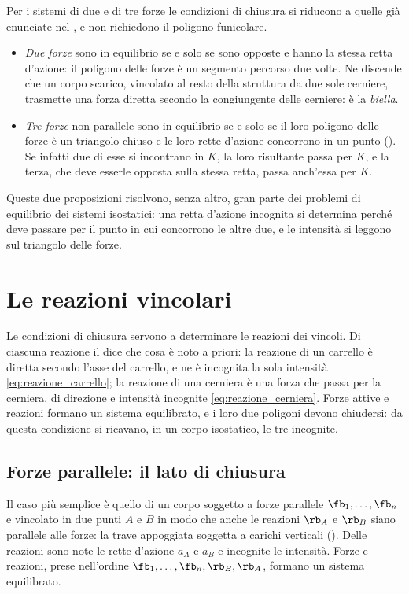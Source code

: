 Per i sistemi di due e di tre forze le condizioni di chiusura si riducono a quelle già enunciate
nel , e non richiedono il poligono funicolare.
\begin{itemize}
	\item \emph{Due forze} sono in equilibrio se e solo se sono opposte e hanno la stessa retta
	d'azione: il poligono delle forze è un segmento percorso due volte. Ne discende che un corpo
	scarico, vincolato al resto della struttura da due sole cerniere, trasmette una forza diretta
	secondo la congiungente delle cerniere: è la \emph{biella}.
	\item \emph{Tre forze} non parallele sono in equilibrio se e solo se il loro poligono delle forze
	è un triangolo chiuso e le loro rette d'azione concorrono in un punto
	(). Se infatti due di esse si incontrano in $K$, la loro risultante
	passa per $K$, e la terza, che deve esserle opposta sulla stessa retta, passa anch'essa per
	$K$.
\end{itemize}
Queste due proposizioni risolvono, senza altro, gran parte dei problemi di equilibrio dei sistemi
isostatici: una retta d'azione incognita si determina perché deve passare per il punto in cui
concorrono le altre due, e le intensità si leggono sul triangolo delle forze.

\section{Le reazioni vincolari}
\label{sec:reazioni_sgr}

Le condizioni di chiusura servono a determinare le reazioni dei vincoli. Di ciascuna reazione il
 dice che cosa è noto a priori: la reazione di un carrello è diretta
secondo l'asse del carrello, e ne è incognita la sola intensità \eqref{eq:reazione_carrello}; la
reazione di una cerniera è una forza che passa per la cerniera, di direzione e intensità incognite
\eqref{eq:reazione_cerniera}. Forze attive e reazioni formano un sistema equilibrato, e i loro
due poligoni devono chiudersi: da questa condizione si ricavano, in un corpo isostatico, le tre
incognite.

\subsection{Forze parallele: il lato di chiusura}
\label{sec:chiusura_sgr}

Il caso più semplice è quello di un corpo soggetto a forze parallele $\fb_1, \dots, \fb_n$ e
vincolato in due punti $A$ e $B$ in modo che anche le reazioni $\rb_A$ e $\rb_B$ siano parallele
alle forze: la trave appoggiata soggetta a carichi verticali (). Delle
reazioni sono note le rette d'azione $a_A$ e $a_B$ e incognite le intensità. Forze e reazioni,
prese nell'ordine $\fb_1, \dots, \fb_n, \rb_B, \rb_A$, formano un sistema equilibrato.

